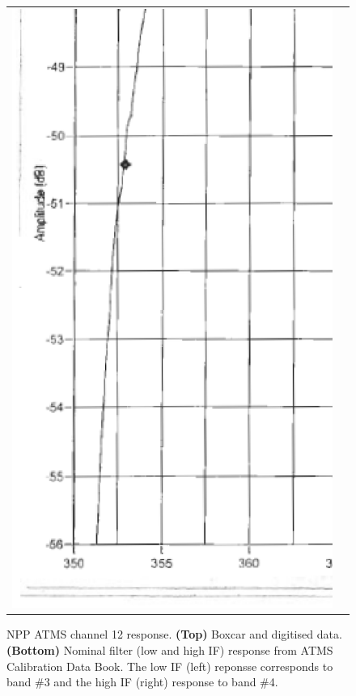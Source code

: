 \begin{figure}[H]
\begin{tabular}{c c}
    \includegraphics[bb=249 194 1431 1035,scale=0.2]{graphics/log_book/ch12_hif.eps}
  \end{tabular}
  \caption{NPP ATMS channel 12 response. \textbf{(Top)} Boxcar and digitised data. \textbf{(Bottom)} Nominal filter (low and high IF) response from ATMS Calibration Data Book\cite{ATMS_PFM_CalLog}. The low IF (left) reponsse corresponds to band \#3 and the high IF (right) response to band \#4.}
  \label{fig:atms_npp.ch12.srf}
\end{figure}


